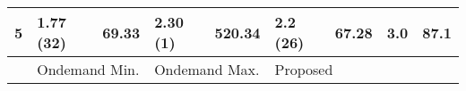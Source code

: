 \begin{table}[H]
{\begin{tabular}{l|l|l|l|l|l|l|ll}
5     & 1.77 (32)                                                                        & 69.33              & 2.30 (1)                                                                         & 520.34             & 2.2 (26)                                                                     & 67.28              & \multicolumn{1}{l|}{3.0}                 & 87.1                \\ \hline
      & \multicolumn{2}{l|}{Ondemand Min.}                                                                    & \multicolumn{2}{l|}{Ondemand Max.}                                                                    & \multicolumn{2}{l|}{Proposed}                                                                     &                                          &                    
\end{tabular}
}
\end{table}

